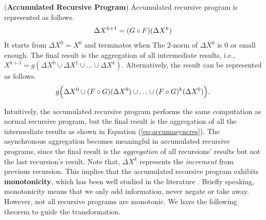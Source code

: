 \begin{definition}
	\label{def:accumasync}
	(\textbf{Accumulated Recursive Program}) Accumulated recursive program is represented as follows.
	\begin{equation}\label{eq:accumasync}
	\begin{aligned}
	\Delta X^{k+1}=(G\circ F)(\Delta X^k)\notag
	\end{aligned}
	\end{equation}
	It starts from $\Delta X^0=X^0$ and terminates when The 2-norm of $\Delta X^k$ is 0 or small enough. The final result is the aggregation of all intermediate results, i.e., $X^{k+1}=g(\Delta X^{0} \cup \Delta X^{1} \cup \ldots \cup \Delta X^{k})$. Alternatively, the result can be represented as follows.
	\begin{equation}
	\label{eq:accumasyncres}
	g\Big(\Delta X^0\cup (F\circ G)(\Delta X^0)\cup\ldots\cup (F\circ G)^k(\Delta X^0)\Big).\notag
	\end{equation}
\end{definition}

Intuitively, the accumulated recursive program performs the same computation as normal recursive program, but the final result is the aggregation of all the intermediate results as shown in Equation (\ref{eq:accumasyncres}). The asynchronous aggregation becomes meaningful in accumulated recursive programs, since the final result is the \emph{aggregation} of all recursions' results but not the last recursion's result. Note that, $\Delta X^{k}$ represents the \emph{increment} from previous recursion. This implies that the accumulated recursive program exhibits \textbf{monotonicity}, which has been well studied in the literature \cite{Hellerstein:2010:DIE:1860702.1860704,calm,Lam:2013:SDE:2510649.2511289,Wang:2015:AFR:2824032.2824052}. Briefly speaking, monotonicity means that we only add information, never negate or take away. However, not all recursive programs are monotonic. We have the following theorem to guide the transformation.


